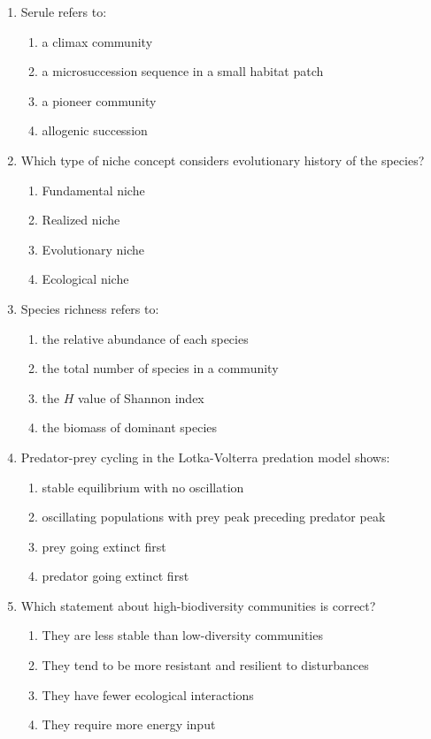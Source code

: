 \documentclass[11pt]{article}
\begin{document}
\begin{enumerate}[label=\textbf{\arabic*.}]
\item Serule refers to:
\begin{enumerate}[label=\Alph*.]
  \item a climax community
  \item a microsuccession sequence in a small habitat patch
  \item a pioneer community
  \item allogenic succession
\end{enumerate}

\item Which type of niche concept considers evolutionary history of the species?
\begin{enumerate}[label=\Alph*.]
  \item Fundamental niche
  \item Realized niche
  \item Evolutionary niche
  \item Ecological niche
\end{enumerate}

\item Species richness refers to:
\begin{enumerate}[label=\Alph*.]
  \item the relative abundance of each species
  \item the total number of species in a community
  \item the $H$ value of Shannon index
  \item the biomass of dominant species
\end{enumerate}

\item Predator-prey cycling in the Lotka-Volterra predation model shows:
\begin{enumerate}[label=\Alph*.]
  \item stable equilibrium with no oscillation
  \item oscillating populations with prey peak preceding predator peak
  \item prey going extinct first
  \item predator going extinct first
\end{enumerate}

\item Which statement about high-biodiversity communities is correct?
\begin{enumerate}[label=\Alph*.]
  \item They are less stable than low-diversity communities
  \item They tend to be more resistant and resilient to disturbances
  \item They have fewer ecological interactions
  \item They require more energy input
\end{enumerate}

\end{enumerate}
\end{document}
